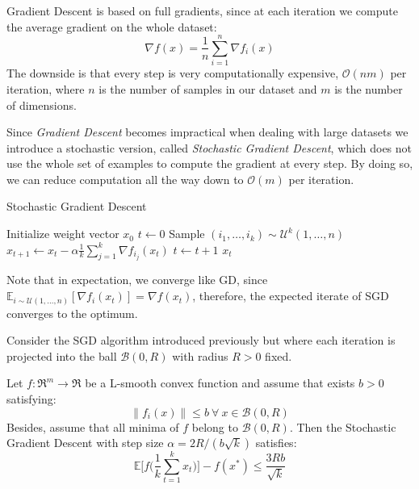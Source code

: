 Gradient Descent is based on full gradients, since at each iteration we compute the average gradient on the whole dataset:
$$
\nabla f(x) = \frac{1}{n} \sum_{i=1}^n \nabla f_i(x)
$$
The downside is that every step is very computationally expensive, $\mathcal{O}(nm)$ per iteration, where $n$ is the number of samples in our dataset and $m$ is the number of dimensions.

Since \emph{Gradient Descent} becomes impractical when dealing with large datasets we introduce a stochastic version, called \emph{Stochastic Gradient Descent}, which does not use the whole set of examples to compute the gradient at every step. By doing so, we can reduce computation all the way down to $\mathcal{O}(m)$ per iteration.

\begin{algorithm}[H]
	\caption{Stochastic Gradient Descent}
	\label{alg:sgd}
	\begin{algorithmic}
			\State Initialize weight vector $x_0$
			\State $t \gets 0$
				\State Sample $(i_1,\dots,i_k) \sim \mathcal{U}^k(1,\dots,n)$ 
				\State $\displaystyle x_{t+1} \gets x_t - \alpha \frac{1}{k} \sum_{j=1}^k \nabla f_{i_j}(x_t)$
				\State $t \gets t + 1$
			\EndWhile
			\State \Return $x_t$
		\EndFunction
	\end{algorithmic}
\end{algorithm}

Note that in expectation, we converge like GD, since $\displaystyle \mathbb{E}_{i \sim \mathcal{U}(1,\dots,n)}[\nabla f_i(x_t)] = \nabla f(x_t)$, therefore, the expected iterate of SGD converges to the optimum.

Consider the SGD algorithm introduced previously but where each iteration is projected into the ball $\mathcal{B}(0, R)$ with radius $R > 0$ fixed.

\begin{theorem} \label{thm:cvx_sgd_convergence}
Let $f: \Re^m \rightarrow \Re$ be a L-smooth convex function and assume that exists $b > 0$ satisfying:
$$
\| f_i(x) \| \leq b \ \forall \ x \in \mathcal{B}(0, R)
$$
Besides, assume that all minima of $f$ belong to $\mathcal{B}(0, R)$. Then the Stochastic Gradient Descent with step size $\alpha = 2R/(b\sqrt{k})$ satisfies:
$$
\mathbb{E}\Bigg[f\Bigg(\frac{1}{k} \sum_{t=1}^k x_t\Bigg)\Bigg] - f(x^*) \leq \frac{3Rb}{\sqrt{k}}
$$
\end{theorem}


